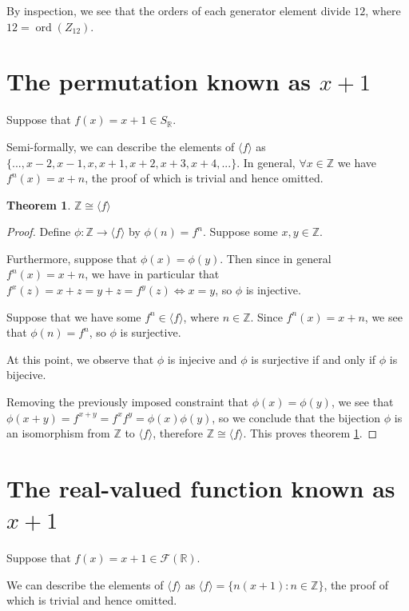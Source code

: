 \documentclass[12pt]{amsart}
\newcommand{\reals}{\mathbb{R}}
\newcommand{\ints}{\mathbb{Z}}
\newcommand{\ord}{\operatorname{ord}}
\newcommand{\freals}{\mathcal{F}(\reals)}
\newtheorem{thm}{Theorem}
\begin{document}
By inspection, we see that the orders of each generator element divide $12$,
where $12 = \ord(Z_{12})$.

\section{The permutation known as $x + 1$}

Suppose that $f(x) = x + 1 \in S_\reals$.

Semi-formally, we can describe the elements of $\langle f \rangle$
as $\{ ..., x - 2, x - 1, x, x + 1, x + 2, x + 3, x + 4, ... \}$.
In general, $\forall x \in \ints$ we have $f^n(x) = x + n$,
the proof of which is trivial and hence omitted.

\begin{thm} \label{thm7}
	$\ints \cong \langle f \rangle$
\end{thm}

\begin{proof}
	Define $\phi: \ints \to \langle f \rangle$
	by $\phi(n) = f^n$.
	Suppose some $x,y \in \ints$.
	
	Furthermore, suppose that $\phi(x) = \phi(y)$.
	Then since in general $f^n(x) = x + n$,
	we have in particular that $f^x(z) = x + z = y + z = f^y(z) \iff x = y$,
	so $\phi$ is injective.

	Suppose that we have some $f^n \in \langle f \rangle$,
	where $n \in \ints$.
	Since $f^n(x) = x + n$,
	we see that $\phi(n) = f^n$,
	so $\phi$ is surjective.

	At this point,
	we observe that
	$\phi$ is injecive
	and $\phi$ is surjective
	if and only if
	$\phi$ is bijecive.

	Removing the previously imposed constraint
	that $\phi(x) = \phi(y)$,
	we see that $\phi(x + y) = f^{x + y} = f^xf^y = \phi(x)\phi(y)$,
	so we conclude that the bijection $\phi$
	is an isomorphism from $\ints$ to $\langle f \rangle$,
	therefore $\ints \cong \langle f \rangle$.
	This proves theorem \ref{thm7}.
\end{proof}

\section{The real-valued function known as $x + 1$}

Suppose that $f(x) = x + 1 \in \freals$.

We can describe the elements of $\langle f \rangle$
as $\langle f \rangle = \{ n(x + 1):n \in \ints \}$,
the proof of which is trivial and hence omitted.
\end{document}
